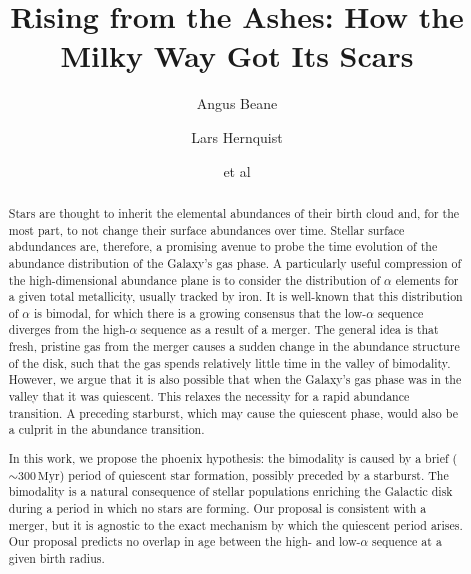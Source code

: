 \documentclass[linenumbers, twocolumn]{aastex631}
\newcommand{\Myr}{\ensuremath{\textrm{Myr}}}
\begin{document}
\title{Rising from the Ashes: How the Milky Way Got Its Scars}

\author{Angus Beane}

\author{Lars Hernquist}

\author{et al}

\begin{abstract}
  Stars are thought to inherit the elemental abundances of their birth cloud and, for the most part, to not change their surface abundances over time. Stellar surface abdundances are, therefore, a promising avenue to probe the time evolution of the abundance distribution of the Galaxy's gas phase. A particularly useful compression of the high-dimensional abundance plane is to consider the distribution of $\alpha$ elements for a given total metallicity, usually tracked by iron. It is well-known that this distribution of $\alpha$ is bimodal, for which there is a growing consensus that the low-$\alpha$ sequence diverges from the high-$\alpha$ sequence as a result of a merger. The general idea is that fresh, pristine gas from the merger causes a sudden change in the abundance structure of the disk, such that the gas spends relatively little time in the valley of bimodality. However, we argue that it is also possible that when the Galaxy's gas phase was in the valley that it was quiescent. This relaxes the necessity for a rapid abundance transition. A preceding starburst, which may cause the quiescent phase, would also be a culprit in the abundance transition.
  
  In this work, we propose the phoenix hypothesis: the bimodality is caused by a brief ($\sim300\,\Myr$) period of quiescent star formation, possibly preceded by a starburst. The bimodality is a natural consequence of stellar populations enriching the Galactic disk during a period in which no stars are forming. Our proposal is consistent with a merger, but it is agnostic to the exact mechanism by which the quiescent period arises. Our proposal predicts no overlap in age between the high- and low-$\alpha$ sequence at a given birth radius.
\end{abstract}

\end{document}
